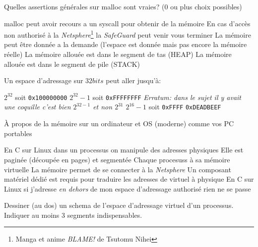 \documentclass[11pt,a4paper,addpoint,answers]{exam}
\begin{document}
  \begin{questions}

    \question[1] Quelles assertions générales sur malloc sont vraies? (0 ou plus choix possibles)
    \begin{checkboxes}
        \CorrectChoice malloc peut avoir recours a un syscall pour obtenir de la mémoire
        \choice En cas d'accès non authorisé à la \emph{Netsphere}\footnote{Manga et anime \emph{BLAME!} de Tsutomu Nihei} la \emph{SafeGuard} peut venir vous terminer
        \CorrectChoice La mémoire peut être donnée a la demande (l'espace est donnée mais pas encore la mémoire réelle)
        \CorrectChoice La mémoire allouée est dans le segment de tas (HEAP)
        \choice La mémoire allouée est dans le segment de pile (STACK)
    \end{checkboxes}
  
    \question[1] Un espace d'adressage sur $32 bits$ peut aller jusqu'à:
    \begin{checkboxes}
      \choice $2^{32}$ soit \texttt{0x100000000}
      \CorrectChoice $2^{32} - 1$ soit \texttt{0xFFFFFFFF} \emph{Erratum: dans le sujet il y avait une coquille c'est bien $2^{32 - 1}$ et non $2^{31}$}
      \choice $2^{16} - 1$ soit \texttt{0xFFFF}
      \choice \texttt{0xDEADBEEF}
    \end{checkboxes}
    
    \question[1] À propos de la mémoire sur un ordinateur et OS (moderne) comme vos PC portables
    \begin{checkboxes}
      \choice En C sur Linux dans un processus on manipule des adresses physiques
      \CorrectChoice Elle est paginée (découpée en pages) et segmentée
      \CorrectChoice Chaque procesuss à sa mémoire virtuelle
      \choice La mémoire permet de se connecter à la \emph{Netsphere} 
      \CorrectChoice Un composant matériel dédié est requis pour traduire les adresses de virtuel à physique
      \choice En C sur Linux si j'adresse \emph{en dehors} de mon espace d'adressage authorisé rien ne se passe
    \end{checkboxes}

    \question[2] Dessiner (au dos) un schema de l'espace d'adressage virtuel d'un processus.
    Indiquer au moins 3 segments indispensables.
     \fi

  \end{questions}
\end{document}
